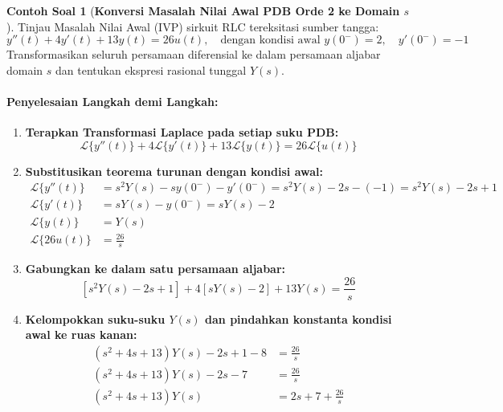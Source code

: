 \documentclass[11pt,a4paper]{article}
\theoremstyle{definition}
\newtheorem{example}{Contoh Soal}[section]
\begin{document}
\begin{example}[\textbf{Konversi Masalah Nilai Awal PDB Orde 2 ke Domain \texorpdfstring{$s$}{s}}]
Tinjau Masalah Nilai Awal (IVP) sirkuit RLC tereksitasi sumber tangga:
\begin{equation*}
    y''(t) + 4y'(t) + 13y(t) = 26 u(t), \quad \text{dengan kondisi awal } y(0^-) = 2, \quad y'(0^-) = -1
\end{equation*}
Transformasikan seluruh persamaan diferensial ke dalam persamaan aljabar domain $s$ dan tentukan ekspresi rasional tunggal $Y(s)$.

\paragraph{Penyelesaian Langkah demi Langkah:}
\begin{enumerate}[leftmargin=*]
    \item \textbf{Terapkan Transformasi Laplace pada setiap suku PDB:}
    \begin{equation*}
        \mathcal{L}\{y''(t)\} + 4\mathcal{L}\{y'(t)\} + 13\mathcal{L}\{y(t)\} = 26\mathcal{L}\{u(t)\}
    \end{equation*}

    \item \textbf{Substitusikan teorema turunan dengan kondisi awal:}
    \begin{align*}
        \mathcal{L}\{y''(t)\} &= s^2 Y(s) - s y(0^-) - y'(0^-) = s^2 Y(s) - 2s - (-1) = s^2 Y(s) - 2s + 1 \\
        \mathcal{L}\{y'(t)\}  &= s Y(s) - y(0^-) = s Y(s) - 2 \\
        \mathcal{L}\{y(t)\}   &= Y(s) \\
        \mathcal{L}\{26 u(t)\} &= \frac{26}{s}
    \end{align*}

    \item \textbf{Gabungkan ke dalam satu persamaan aljabar:}
    \begin{equation*}
        \left[ s^2 Y(s) - 2s + 1 \right] + 4\left[ s Y(s) - 2 \right] + 13 Y(s) = \frac{26}{s}
    \end{equation*}

    \item \textbf{Kelompokkan suku-suku $Y(s)$ dan pindahkan konstanta kondisi awal ke ruas kanan:}
    \begin{align*}
        \left( s^2 + 4s + 13 \right) Y(s) - 2s + 1 - 8 &= \frac{26}{s} \\
        \left( s^2 + 4s + 13 \right) Y(s) - 2s - 7 &= \frac{26}{s} \\
        \left( s^2 + 4s + 13 \right) Y(s) &= 2s + 7 + \frac{26}{s}
    \end{align*}


\end{enumerate}
\end{example}
\end{document}
